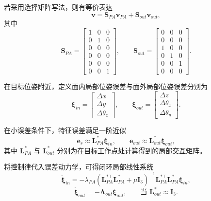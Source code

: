 \documentclass{article}
\begin{document}
若采用选择矩阵写法，则有等价表达
\begin{equation}
\mathbf{v} = \mathbf{S}_{PA}\mathbf{v}_{PA} + \mathbf{S}_{out}\mathbf{v}_{out},
\end{equation}
其中
\begin{equation}
\mathbf{S}_{PA} =
\begin{bmatrix}
1 & 0 & 0 \\
0 & 1 & 0 \\
0 & 0 & 0 \\
0 & 0 & 0 \\
0 & 0 & 0 \\
0 & 0 & 1
\end{bmatrix},
\qquad
\mathbf{S}_{out} =
\begin{bmatrix}
0 & 0 & 0 \\
0 & 0 & 0 \\
1 & 0 & 0 \\
0 & 1 & 0 \\
0 & 0 & 1 \\
0 & 0 & 0
\end{bmatrix}.
\end{equation}

在目标位姿附近，定义面内局部位姿误差与面外局部位姿误差分别为
\begin{equation}
\boldsymbol{\xi}_{in} =
\begin{bmatrix}
\Delta x \\ \Delta y \\ \Delta \theta_z
\end{bmatrix},
\qquad
\boldsymbol{\xi}_{out} =
\begin{bmatrix}
\Delta z \\ \Delta \theta_x \\ \Delta \theta_y
\end{bmatrix}.
\end{equation}

在小误差条件下，特征误差满足一阶近似
\begin{equation}
\mathbf{e}_{s} \approx \mathbf{L}_{PA}^{*}\boldsymbol{\xi}_{in}, \qquad
\mathbf{e}_{out} \approx \mathbf{L}_{out}^{*}\boldsymbol{\xi}_{out},
\end{equation}
其中 $\mathbf{L}_{PA}^{*}$ 与 $\mathbf{L}_{out}^{*}$ 分别为在目标工作点处计算得到的局部交互矩阵。

将控制律代入误差动力学，可得闭环局部线性系统
\begin{equation}
\dot{\boldsymbol{\xi}}_{in}
=
-\lambda_{PA}
(\mathbf{L}_{PA}^{*\top}\mathbf{L}_{PA}^{*} + \mu \mathbf{I}_3)^{-1}
\mathbf{L}_{PA}^{*\top}\mathbf{L}_{PA}^{*}\boldsymbol{\xi}_{in},
\end{equation}
\begin{equation}
\dot{\boldsymbol{\xi}}_{out} = -\boldsymbol{\Lambda}_{out}\boldsymbol{\xi}_{out},
\qquad \text{当 } \mathbf{L}_{out}^{*} \approx \mathbf{I}_{3}.
\end{equation}
\end{document}
